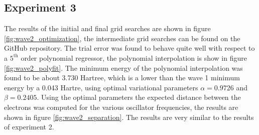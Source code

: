 \documentclass[nofootinbib,reprint,english]{revtex4-1}
\begin{document}
\subsection{Experiment 3}
The results of the initial and final grid searches are shown in figure \ref{fig:wave2_optimization}, the intermediate grid searches can be found on the GitHub repository. The trial error was found to behave quite well with respect to a \(5^\text{th}\) order polynomial regressor, the polynomial interpolation is show in figure \ref{fig:wave2_polyfit}. The minimum energy of the polynomial interpolation was found to be about 3.730 Hartree, which is a lower than the wave 1 minimum energy by a 0.043 Hartre, using optimal variational parameters \(\alpha=0.9726\) and \(\beta=0.2405\). Using the optimal parameters the expected distance between the electrons was computed for the various oscillator frequencies, the results are shown in figure \ref{fig:wave2_separation}. The results are very similar to the results of experiment 2.
\end{document}
